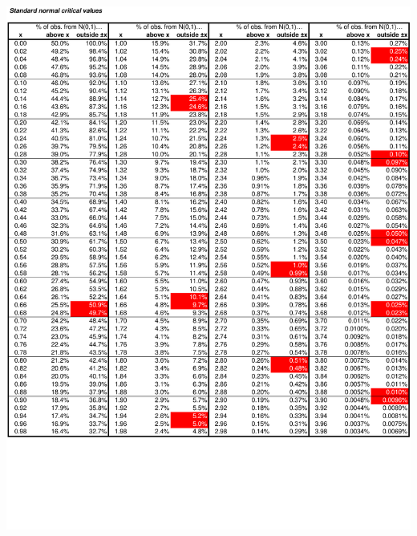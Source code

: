 \documentclass[8pt,letterpaper, landscape]{extarticle} %
\begin{document}
\begin{center}
\includegraphics[height=9.75in, angle=90]{cv2}

\end{center}
\end{document}
